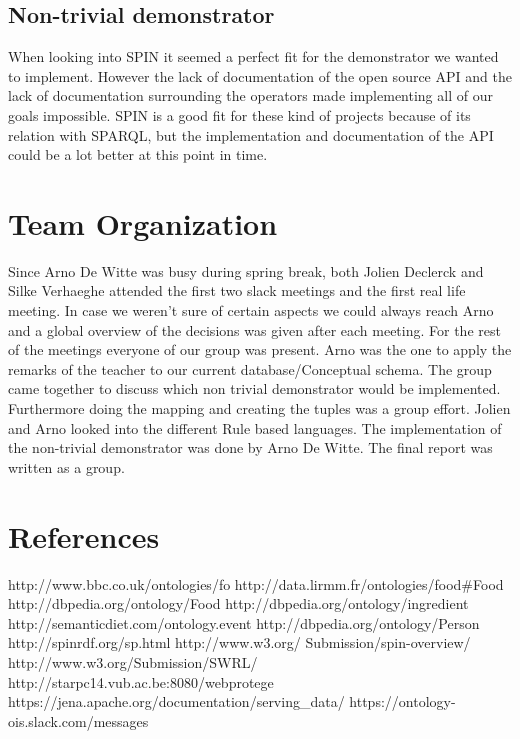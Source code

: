 \subsection{Non-trivial demonstrator}
When looking into SPIN it seemed a perfect fit for the demonstrator we wanted to implement. However the lack of documentation of the open source API and the lack of documentation surrounding the operators made implementing all of our goals impossible. SPIN is a good fit for these kind of projects because of its relation with SPARQL, but the implementation and documentation of the API could be a lot better at this point in time.

\section{Team Organization}

Since Arno De Witte was busy during spring break, both Jolien Declerck and Silke Verhaeghe attended the first two slack meetings and the first real life meeting. In case we weren't sure of certain aspects we could always reach Arno and a global overview of the decisions was given after each meeting. For the rest of the meetings everyone of our group was present. Arno was the one to apply the remarks of the teacher to our current database/Conceptual schema. The group came together to discuss which non trivial demonstrator would be implemented. Furthermore doing the mapping and creating the tuples was a group effort. Jolien and Arno looked into the different Rule based languages. The implementation of the non-trivial demonstrator was done by Arno De Witte. The final report was written as a group. 

\section*{References}
http://www.bbc.co.uk/ontologies/fo\newline
http://data.lirmm.fr/ontologies/food\#Food\newline
http://dbpedia.org/ontology/Food \newline
http://dbpedia.org/ontology/ingredient\newline
http://semanticdiet.com/ontology.event \newline
http://dbpedia.org/ontology/Person \newline
http://spinrdf.org/sp.html\newline
http://www.w3.org/
Submission/spin-overview/\newline
http://www.w3.org/Submission/SWRL/\newline
http://starpc14.vub.ac.be:8080/webprotege \newline
https://jena.apache.org/documentation/serving\_data/ \newline
https://ontology-ois.slack.com/messages

